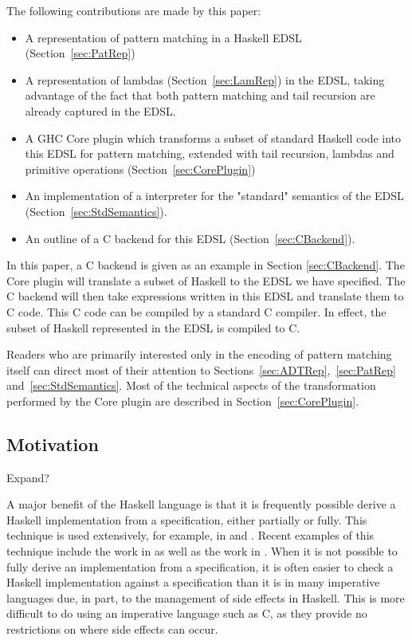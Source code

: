 \documentclass[runningheads, a4paper]{llncs}
\newenvironment{todont}
               {\comment}
               {\endcomment}
\begin{document}
The following contributions are made by this paper:

\begin{itemize}
  \item A representation of pattern matching in a Haskell EDSL (Section~\ref{sec:PatRep})
  \item A representation of lambdas (Section~\ref{sec:LamRep}) in the EDSL, taking advantage of
  the fact that both pattern matching and tail recursion are already captured in
  the EDSL.
\item A GHC Core plugin which transforms a subset of standard Haskell code
  into this EDSL for pattern matching, extended with tail recursion,
  lambdas and primitive operations (Section~\ref{sec:CorePlugin})
\item An implementation of a interpreter for the "standard" semantics of the EDSL (Section~\ref{sec:StdSemantics}).
\item An outline of a C backend for this EDSL (Section~\ref{sec:CBackend}).
\end{itemize}

In this paper, a C backend is given as an example in Section \ref{sec:CBackend}. The Core plugin will
translate a subset of Haskell to the EDSL we have specified. The C backend will
then take expressions written in this EDSL and translate them to C code. This C
code can be compiled by a standard C compiler. In effect, the subset of Haskell
represented in the EDSL is compiled to C.

Readers who are primarily interested only in the encoding of pattern matching itself can direct
most of their attention to Sections~\ref{sec:ADTRep},~\ref{sec:PatRep} and~\ref{sec:StdSemantics}. Most of the technical aspects of
the transformation performed by the Core plugin are described in Section~\ref{sec:CorePlugin}.

\subsection{Motivation}

\begin{todont}
  Expand?
\end{todont}

A major benefit of the Haskell language is that it is frequently possible derive
a Haskell implementation from a specification, either partially or fully.  This
technique is used extensively, for example, in \cite{Bird:2010:Pearls} and
\cite{Gibbons:2002:Calc}.  Recent examples of this technique include the work in
\cite{Elliott-2018-ad-icfp} as well as the work in
\cite{Elliott2019-convolution-extended}.  When it is not possible to fully
derive an implementation from a specification, it is often easier to check a
Haskell implementation against a specification than it is in many imperative
languages due, in part, to the management of side effects in Haskell. This is
more difficult to do using an imperative language such as C, as they provide no
restrictions on where side effects can occur.
\end{document}
